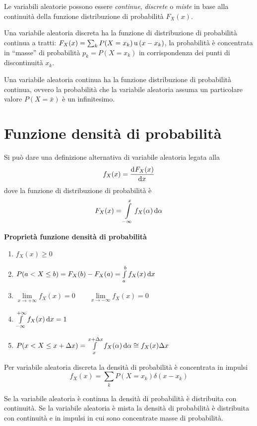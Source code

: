 Le variabili aleatorie possono essere \emph{continue}, \emph{discrete} o \emph{miste} in base alla continuità della funzione distribuzione di probabilità $F_X(x)$.

Una variabile aleatoria discreta ha la funzione di distribuzione di probabilità continua a tratti: $F_X(x)=\sum_k P(X=x_k)\operatorname{u}{(x-x_k)}$, la probabilità è concentrata in “masse” di probabilità $p_k=P(X=x_k)$ in corrispondenza dei punti di discontinuità $x_k$.

Una variabile aleatoria continua ha la funzione distribuzione di probabilità continua, ovvero la probabilità che la variabile aleatoria assuma un particolare valore $P(X=\bar{x})$ è un infinitesimo. 

\section{Funzione densità di probabilità}
Si può dare una definizione alternativa di variabile aleatoria legata alla 
\begin{equation}\label{eq:funz_dens_prob}
f_X(x)=\dfrac{\mathop{}\!\mathrm{d}^{}F_X(x)}{\mathop{}\!\mathrm{d} x^{}}
\end{equation}
dove la funzione di distribuzione di probabilità è
\begin{equation}F_X(x)=\int\limits_{-\infty}^{x}{f_X(\alpha)}{\,\mathop{}\!\mathrm{d}{\alpha}}\end{equation}

\textbf{Proprietà funzione densità di probabilità}
\begin{enumerate}
\item $f_X(x)\geq 0$
\item $P(a<X\leq b)=F_X(b)-F_X(a)=\int\limits_{a}^{b}{f_X(x)}{\,\mathop{}\!\mathrm{d}{x}}$
\item $\lim\limits_{x\to+\infty}f_X(x)=0\qquad\lim\limits_{x\to-\infty}f_X(x)=0$
\item $\int\limits_{-\infty}^{+\infty}{f_X(x)}{\,\mathop{}\!\mathrm{d}{x}}=1$
\item $P(x<X\leq x+\Delta x)=\int\limits_{x}^{x+\Delta x}{f_X(\alpha)}{\,\mathop{}\!\mathrm{d}{\alpha}}\cong f_X(x)\Delta x$
\end{enumerate}

Per variabile aleatoria discreta la densità di probabilità è concentrata in impulsi
\begin{equation}f_X(x)=\sum_k P(X=x_k) \delta(x-x_k)\end{equation}

Se la variabile aleatoria è continua la densità di probabilità è distribuita con continuità.
Se la variabile aleatoria è mista la densità di probabilità è distribuita con continuità e in impulsi in cui sono concentrate masse di probabilità.

